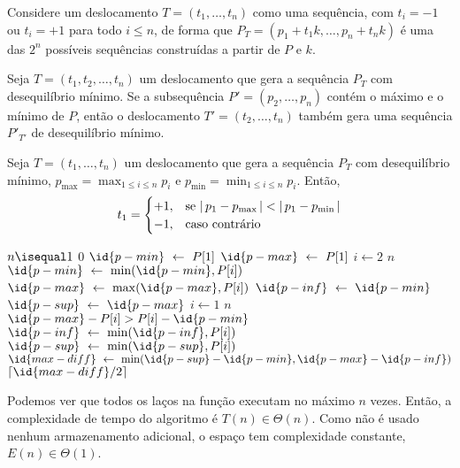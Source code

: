 Considere um deslocamento $T = (t_1, \ldots, t_n)$ como uma sequência, com $t_i = -1$ ou $t_i = +1$ para todo $i \leq n$, de forma que $P_T = (p_1 + t_1 k, \ldots, p_n + t_n k)$ é uma das $2^n$ possíveis sequências construídas a partir de $P$ e $k$.

\itemdsep

\begin{theorem}
    Seja $T = (t_1, t_2, \ldots, t_n)$ um deslocamento que gera a sequência $P_T$ com desequilíbrio mínimo. Se a subsequência $P' = (p_2, \ldots, p_n)$ contém o máximo e o mínimo de $P$, então o deslocamento $T' = (t_2, \ldots, t_n)$ também gera uma sequência $P'_{T'}$ de desequilíbrio mínimo.
\end{theorem}

\itemdsep

\begin{theorem}
    Seja $T = (t_1, \ldots, t_n)$ um deslocamento que gera a sequência $P_T$ com desequilíbrio mínimo, $p_{\max} = \max_{1 \leq i \leq n} p_i$ e $p_{\min} = \min_{1 \leq i \leq n} p_i$. Então,
    \[
        t_1 = \begin{cases}
            +1, & \text{se } {\lvert\,p_1 - p_{\max}\,\rvert} < {\lvert\,p_1 - p_{\min}\,\rvert} \\
            -1, & \text{caso contrário}
        \end{cases}
    \]
\end{theorem}

\itemdsep

\begin{codebox}
    \li {} $n \isequal 1$ 
        \Do
    \li     {} 0
        \End
    \li
    \li $\id{p-min} \gets P[1]$
    \li $\id{p-max} \gets P[1]$
    \li {} $i \gets 2$  $n$
        \Do
    \li     $\id{p-min} \gets \min(\id{p-min}, P[i])$
    \li     $\id{p-max} \gets \max(\id{p-max}, P[i])$
        \End
    \li
    \li $\id{p-inf} \gets \id{p-min}$
    \li $\id{p-sup} \gets \id{p-max}$
    \li {} $i \gets 1$  $n$
        \Do
    \li     {} $\id{p-max} - P[i] > P[i] - \id{p-min}$ 
            \Do
    \li         $\id{p-inf} \gets \min(\id{p-inf}, P[i])$
            \End
    \li     {}
            \Do
    \li         $\id{p-sup} \gets \min(\id{p-sup}, P[i])$
            \End
        \End
    \li
    \li $\id{max-diff} \gets \min(\id{p-sup} - \id{p-min}, \id{p-max} - \id{p-inf})$
    \li {} $\lceil \id{max-diff} / 2 \rceil$
\end{codebox}

\itemdsep

Podemos ver que todos os laços na função executam no máximo $n$ vezes. Então, a complexidade de tempo do algoritmo é $T(n) \in \Theta(n)$. Como não é usado nenhum armazenamento adicional, o espaço tem complexidade constante, $E(n) \in \Theta(1)$.

